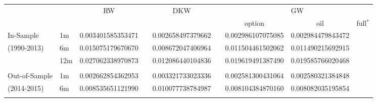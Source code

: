 \documentclass{article}
\begin{document}
\begin{tabular}{llccccccc}
\hline\hline
&  & RW &  & DKW &  & \multicolumn{3}{c}{GW} \\ \cline{7-9}
&  &  &  &  &  & option & oil & full$^{\ast }$ \\ \hline
In-Sample & 1m & \multicolumn{1}{l}{0.003401585353471} & \multicolumn{1}{l}{}
& \multicolumn{1}{l}{0.002658497379662} & \multicolumn{1}{l}{} & 
\multicolumn{1}{l}{0.002986107075085} & \multicolumn{1}{l}{0.002984479843472}
& \multicolumn{1}{l}{} \\ 
(1990-2013) & 6m & \multicolumn{1}{l}{0.015075179670670} & 
\multicolumn{1}{l}{} & \multicolumn{1}{l}{0.008672047406964} & 
\multicolumn{1}{l}{} & \multicolumn{1}{l}{0.011504461502062} & 
\multicolumn{1}{l}{0.011490215692915} & \multicolumn{1}{l}{} \\ 
& 12m & \multicolumn{1}{l}{0.027062338970873} & \multicolumn{1}{l}{} & 
\multicolumn{1}{l}{0.012086440104836} & \multicolumn{1}{l}{} & 
\multicolumn{1}{l}{0.019619491387490} & \multicolumn{1}{l}{0.019585766020468}
& \multicolumn{1}{l}{} \\ 
&  & \multicolumn{1}{l}{} & \multicolumn{1}{l}{} & \multicolumn{1}{l}{} & 
\multicolumn{1}{l}{} & \multicolumn{1}{l}{} & \multicolumn{1}{l}{} & 
\multicolumn{1}{l}{} \\ \hline
Out-of-Sample & 1m & \multicolumn{1}{l}{0.002662854362953} & 
\multicolumn{1}{l}{} & \multicolumn{1}{l}{0.003321733023336} & 
\multicolumn{1}{l}{} & \multicolumn{1}{l}{0.002581300431064} & 
\multicolumn{1}{l}{0.002580321384848} & \multicolumn{1}{l}{} \\ 
(2014-2015) & 6m & \multicolumn{1}{l}{0.008535651121990} & 
\multicolumn{1}{l}{} & \multicolumn{1}{l}{0.010077738784987} & 
\multicolumn{1}{l}{} & \multicolumn{1}{l}{0.008104384870160} & 
\multicolumn{1}{l}{0.008082035195854} &  \\ 
&  & \multicolumn{1}{l}{} & \multicolumn{1}{l}{} & \multicolumn{1}{l}{} & 
\multicolumn{1}{l}{} & \multicolumn{1}{l}{} & \multicolumn{1}{l}{} & 
\multicolumn{1}{l}{} \\ \hline\hline
\end{tabular}

\bigskip
\end{document}
